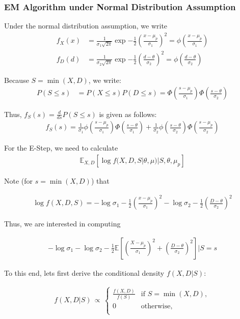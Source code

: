 \documentclass[11pt, oneside]{article}   	%
\theoremstyle{ModifiedStyle}
\begin{document}
	  \subsubsection{EM Algorithm under Normal Distribution Assumption}
	    Under the normal distribution assumption, we write
			\begin{align*}
				f_X(x) &= \frac{1}{\sigma_1 \sqrt{2\pi}} \exp{-\frac{1}{2} (\frac{x-\mu_p}{\sigma_1})^2} = \phi(\frac{x-\mu_p}{\sigma_1})\\
				f_D(d) &= \frac{1}{\sigma_2 \sqrt{2\pi}} \exp{-\frac{1}{2} (\frac{d - \theta}{\sigma_2})^2} = \phi(\frac{d-\theta}{\sigma_2})
			\end{align*}

			Because $S = \min(X,D)$, we write:
			\begin{align*}
				P(S \leq s) &= P(X \leq s) P(D \leq s) = \Phi(\frac{s-\mu_p}{\sigma_1}) \Phi(\frac{s-\theta}{\sigma_2})
			\end{align*}

			Thus, $f_S(s) = \frac{d}{ds} P(S \leq s)$ is given as follows:
			\begin{align*}
				f_S(s) = \frac{1}{\sigma_1} \phi(\frac{s-\mu_p}{\sigma_1}) \Phi(\frac{s-\theta}{\sigma_1}) + \frac{1}{\sigma_2}\phi(\frac{s-\theta}{\sigma_2}) \Phi(\frac{s-\mu_p}{\sigma_2})
			\end{align*}

			For the E-Step, we need to calculate
			\begin{align*}
				\mathbb{E}_{X,D}[\log f(X,D,S|\theta,\mu) | S,\theta,\mu_p]
			\end{align*}

			Note (for $s = \min(X,D)$) that

			\begin{align*}
				\log f(X,D,S) = -\log \sigma_1 - \frac{1}{2}(\frac{x-\mu_p}{\sigma_1})^2 - \log \sigma_2 - \frac{1}{2} (\frac{D-\theta}{\sigma_2})^2
			\end{align*}

			Thus, we are interested in computing

			\begin{align*}
				-\log \sigma_1 - \log \sigma_2 - \frac{1}{2} \mathbb{E}[(\frac{X-\mu_p}{\sigma_1})^2 + (\frac{D-\theta}{\sigma_2})^2] | S=s
			\end{align*}

			To this end, lets first derive the conditional density $f(X,D|S)$:

			\begin{align*}
			f(X,D|S) \,\propto\, \left \{\!\! \begin{array}{ll}
			\frac{f(X,D)}{f(S)} & \text{if } S= \min(X,D), \\
			0 & \text{otherwise}, \\
			\end{array} \right.
			\end{align*}
\end{document}
